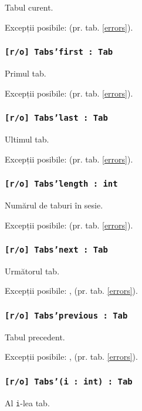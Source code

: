 Tabul curent.

Excepții posibile:  (pr. tab. \ref{errors}).

\subsubsection{\texttt{[r/o] Tabs'first : Tab}}

Primul tab.

Excepții posibile:  (pr. tab. \ref{errors}).

\subsubsection{\texttt{[r/o] Tabs'last : Tab}}

Ultimul tab.

Excepții posibile:  (pr. tab. \ref{errors}).

\subsubsection{\texttt{[r/o] Tabs'length : int}}

Numărul de taburi în sesie.

Excepții posibile:  (pr. tab. \ref{errors}).

\subsubsection{\texttt{[r/o] Tabs'next : Tab}}

Următorul tab.

Excepții posibile: ,  (pr. tab. \ref{errors}).

\subsubsection{\texttt{[r/o] Tabs'previous : Tab}}

Tabul precedent.

Excepții posibile: ,  (pr. tab. \ref{errors}).

\subsubsection{\texttt{[r/o] Tabs'(i : int) : Tab}}

Al \texttt{i}-lea tab.

